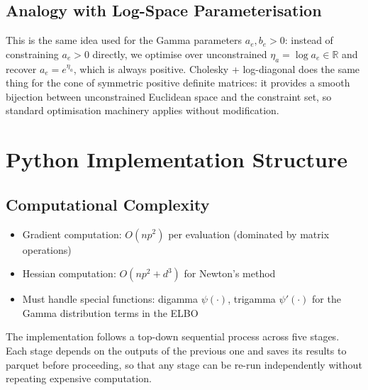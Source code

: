\documentclass[11pt,a4paper]{article}
\newcommand{\R}{\mathbb{R}}
\begin{document}
\subsection*{Analogy with Log-Space Parameterisation}

This is the same idea used for the Gamma parameters $a_e, b_e > 0$: instead of constraining $a_e > 0$ directly, we optimise over unconstrained $\eta_a = \log a_e \in \R$ and recover $a_e = e^{\eta_a}$, which is always positive. Cholesky + log-diagonal does the same thing for the cone of symmetric positive definite matrices: it provides a smooth bijection between unconstrained Euclidean space and the constraint set, so standard optimisation machinery applies without modification.

\bigskip


\section{Python Implementation Structure}
\label{app:python-code}

\subsection*{Computational Complexity}

\begin{itemize}
\item Gradient computation: $O(np^2)$ per evaluation (dominated by matrix operations)
\item Hessian computation: $O(np^2 + d^3)$ for Newton's method
\item Must handle special functions: digamma $\psi(\cdot)$, trigamma $\psi'(\cdot)$ for the Gamma distribution terms in the ELBO
\end{itemize}

The implementation follows a top-down sequential process across five stages.
Each stage depends on the outputs of the previous one and saves its results to parquet before proceeding,
so that any stage can be re-run independently without repeating expensive computation.
\end{document}
